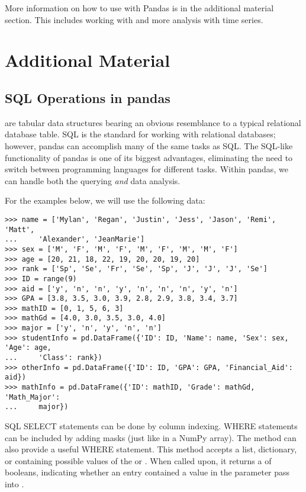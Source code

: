 More information on how to use  with Pandas is in the additional material section.
This includes working with  and more analysis with time series.
\pagebreak

\section*{Additional Material}
\subsection*{SQL Operations in pandas} %

 are tabular data structures bearing an obvious resemblance to a typical relational
database table.
SQL is the standard for working with relational databases; however, pandas can accomplish many of the same tasks as SQL.
The SQL-like functionality of pandas is
one of its biggest advantages, eliminating the need to switch between programming languages
for different tasks.
Within pandas, we can handle both the querying \emph{and} data analysis.

For the examples below, we will use the following data:
\begin{lstlisting}
>>> name = ['Mylan', 'Regan', 'Justin', 'Jess', 'Jason', 'Remi', 'Matt',
...		'Alexander', 'JeanMarie']
>>> sex = ['M', 'F', 'M', 'F', 'M', 'F', 'M', 'M', 'F']
>>> age = [20, 21, 18, 22, 19, 20, 20, 19, 20]
>>> rank = ['Sp', 'Se', 'Fr', 'Se', 'Sp', 'J', 'J', 'J', 'Se']
>>> ID = range(9)
>>> aid = ['y', 'n', 'n', 'y', 'n', 'n', 'n', 'y', 'n']
>>> GPA = [3.8, 3.5, 3.0, 3.9, 2.8, 2.9, 3.8, 3.4, 3.7]
>>> mathID = [0, 1, 5, 6, 3]
>>> mathGd = [4.0, 3.0, 3.5, 3.0, 4.0]
>>> major = ['y', 'n', 'y', 'n', 'n']
>>> studentInfo = pd.DataFrame({'ID': ID, 'Name': name, 'Sex': sex, 'Age': age,
...		'Class': rank})
>>> otherInfo = pd.DataFrame({'ID': ID, 'GPA': GPA, 'Financial_Aid': aid})
>>> mathInfo = pd.DataFrame({'ID': mathID, 'Grade': mathGd, 'Math_Major':
...		major})
\end{lstlisting}

SQL SELECT statements can be done by column indexing.
WHERE statements can be included by adding masks (just like in a NumPy array).
The method  can also provide a useful WHERE statement.
This method accepts a list, dictionary, or  containing possible values of the  or .
When called upon, it returns a  of booleans, indicating whether an entry contained a value in the parameter pass into .


